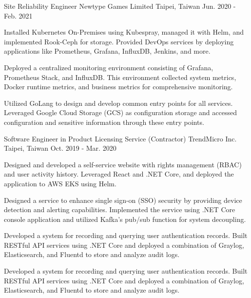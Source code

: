 \begin{cventries}
\cventry
{Site Reliability Engineer} %
{Newtype Games Limited} %
{Taipei, Taiwan} %
{Jun. 2020 - Feb. 2021} %
{
  \begin{cvitems} %
    \item {Installed Kubernetes On-Premises using Kubespray, managed it with Helm, and implemented Rook-Ceph for storage. Provided DevOps services by deploying applications like Prometheus, Grafana, InfluxDB, Jenkins, and more.}
    \item {Deployed a centralized monitoring environment consisting of Grafana, Prometheus Stack, and InfluxDB. This environment collected system metrics, Docker runtime metrics, and business metrics for comprehensive monitoring.}
    \item {Utilized GoLang to design and develop common entry points for all services. Leveraged Google Cloud Storage (GCS) as configuration storage and accessed configuration and sensitive information through these entry points.}
  \end{cvitems}
}

\cventry
{Software Engineer in Product Licensing Service (Contractor)} %
{TrendMicro Inc.} %
{Taipei, Taiwan} %
{Oct. 2019 - Mar. 2020} %
{
  \begin{cvitems} %
    \item {Designed and developed a self-service website with rights management (RBAC) and user activity history. Leveraged React and .NET Core, and deployed the application to AWS EKS using Helm.}
    \item {Designed a service to enhance single sign-on (SSO) security by providing device detection and alerting capabilities. Implemented the service using .NET Core console application and utilized Kafka's pub/sub function for system decoupling.}
    \item {Developed a system for recording and querying user authentication records. Built RESTful API services using .NET Core and deployed a combination of Graylog, Elasticsearch, and Fluentd to store and analyze audit logs.}
    \item {Developed a system for recording and querying user authentication records. Built RESTful API services using .NET Core and deployed a combination of Graylog, Elasticsearch, and Fluentd to store and analyze audit logs.}
  \end{cvitems}
}


\end{cventries}
